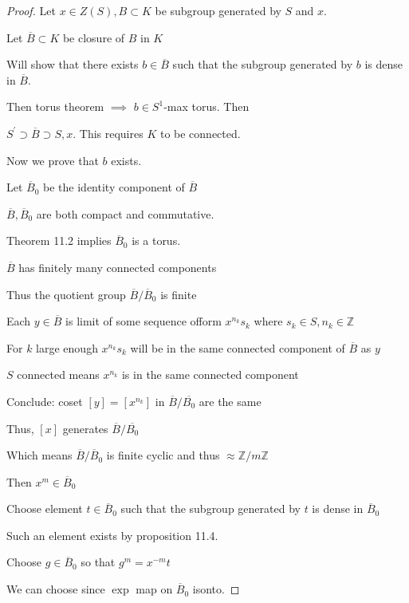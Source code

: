 \documentclass{article}
\theoremstyle{definition}
\begin{document}
\begin{proof}
    Let \(x\in Z(S), B \subset K\) be subgroup generated by \(S\) and \(x\).
    
    Let \(\overline{B} \subset K\) be closure of \(B\) in \(K\)
    
    Will show that there exists \(b\in \overline{B}\) such that the subgroup generated by \(b\) is dense in \(\overline{B}\).
    
    Then torus theorem \(\implies\) \(b\in S^1\)-max torus. Then
    
    \(S^{\prime} \supset \overline{B} \supset S,x \). This requires \(K\) to be connected.

    Now we prove that \(b\) exists.

    Let \(\overline{B}_0\) be the identity component of \(\overline{B}\)
    
    \(\overline{B} ,\overline{B}_0\) are both compact and commutative.
    
    Theorem 11.2 implies \(\overline{B}_0\) is a torus.
    
    \(\overline{B}\) has finitely many connected components
    
    Thus the quotient group \(\overline{B} / \overline{B}_0\) is finite
    
    Each \(y\in \overline{B}\) is limit of some sequence ofform \(x^{n_k}s_k\) where \(s_k\in S, n_k\in\mathbb{Z}\) 

    For \(k\) large enough \(x^{n_k}s_k\) will be in the same connected component of \(\overline{B}\)  as \(y\) 
    
    \(S\) connected means \(x^{n_k}\) is in the same connected component

    Conclude: coset \([y]=[x^{n_k}]\) in \(\overline{B} / \overline{B_0}\) are the same
    
    Thus, \([x]\) generates \(\overline{B} / \overline{B_0}\)
    
    Which means \(\overline{B} / \overline{B}_0\) is finite cyclic and thus \(\approx \mathbb{Z} / m \mathbb{Z}\)  

    Then \(x^m\in \overline{B}_0\)
    
    Choose element \(t\in \overline{B}_0\) such that the subgroup generated by \(t\) is dense in \(\overline{B}_0\)
    
    Such an element exists by proposition 11.4.

    Choose \(g\in \overline{B}_0\) so that \(g^m = x^{-m}t\) 
    
    We can choose since \(\exp\) map on  \(\overline{B}_0\) isonto.
    

\end{proof}
\end{document}
